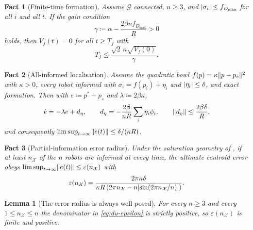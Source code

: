 \documentclass[11pt,a4paper]{article}
\theoremstyle{plain}
\newtheorem{fact}{Fact}
\newtheorem{lemma}{Lemma}
\theoremstyle{definition}
\newcommand{\G}{\mathcal{G}}
\DeclarePairedDelimiter{\norm}{\lVert}{\rVert}
\DeclarePairedDelimiter{\abs}{\lvert}{\rvert}
\begin{document}
\begin{fact}[Finite-time formation]\label{fact:formation}
Assume $\G$ connected, $n\geq3$, and $\abs{\sigma_i}\leq f_{D_{\max}}$ for all $i$ and all $t$.
If the gain condition
\begin{equation}\label{eq:gain-condition}
    \gamma\coloneqq\alpha-\frac{2\beta n f_{D_{\max}}}{R}>0
\end{equation}
holds, then $V_f(t)=0$ for all $t\geq T_f$ with
\begin{equation}\label{eq:formation-time}
    T_f\leq\frac{\sqrt2\,n\sqrt{V_f(0)}}{\gamma}.
\end{equation}
\end{fact}

\begin{fact}[All-informed localisation]\label{fact:localisation}
Assume the quadratic bowl $f(p)=\kappa\norm{p-p_s}^2$ with $\kappa>0$, every robot informed
with $\sigma_i=f(p_i)+\eta_i$ and $\abs{\eta_i}\leq\delta$, and exact formation. Then with
$e\coloneqq p^*-p_s$ and $\lambda\coloneqq2\beta\kappa$,
\begin{equation}\label{eq:baseline-error-dynamics}
    \dot e=-\lambda e+d_\eta,
    \qquad
    d_\eta=-\frac{2\beta}{nR}\sum_i\eta_i\phi_i,
    \qquad
    \norm{d_\eta}\leq\frac{2\beta\delta}{R},
\end{equation}
and consequently $\limsup_{t\to\infty}\norm{e(t)}\leq\delta/(\kappa R)$.
\end{fact}

\begin{fact}[Partial-information error radius]\label{fact:epsilon}
Under the saturation geometry of \cite{du2024}, if at least $n_{\mathcal X}$ of the $n$ robots
are informed at every time, the ultimate centroid error obeys
$\limsup_{t\to\infty}\norm{e(t)}\leq\varepsilon(n_{\mathcal X})$ with
\begin{equation}\label{eq:du-epsilon}
    \varepsilon(n_{\mathcal X})
    =\frac{2\pi n\delta}
    {\kappa R\left(2\pi n_{\mathcal X}-n\abs{\sin\!\left(2\pi n_{\mathcal X}/n\right)}\right)}.
\end{equation}
\end{fact}

\begin{lemma}[The error radius is always well posed]\label{lem:denominator}
For every $n\geq3$ and every $1\leq n_{\mathcal X}\leq n$ the denominator in
\eqref{eq:du-epsilon} is strictly positive, so $\varepsilon(n_{\mathcal X})$ is finite and positive.
\end{lemma}
\end{document}

